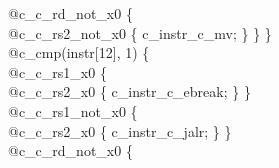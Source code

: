 {\indent \hspace{\parindent} \hspace{\parindent} \hspace{\parindent} \hspace{\parindent} @c\_c\_rd\_not\_x0 \{\\%
\indent \hspace{\parindent} \hspace{\parindent} \hspace{\parindent} \hspace{\parindent} \hspace{\parindent} @c\_c\_rs2\_not\_x0 \{ c\_instr\_c\_mv; \} \} \}\\%
\indent \hspace{\parindent} \hspace{\parindent} \hspace{\parindent} @c\_cmp(instr[12], 1) \{\\%
\indent \hspace{\parindent} \hspace{\parindent} \hspace{\parindent} \hspace{\parindent} @c\_c\_rs1\_x0 \{\\%
\indent \hspace{\parindent} \hspace{\parindent} \hspace{\parindent} \hspace{\parindent} \hspace{\parindent} @c\_c\_rs2\_x0 \{ c\_instr\_c\_ebreak; \} \}\\%
\indent \hspace{\parindent} \hspace{\parindent} \hspace{\parindent} \hspace{\parindent} @c\_c\_rs1\_not\_x0 \{\\%
\indent \hspace{\parindent} \hspace{\parindent} \hspace{\parindent} \hspace{\parindent} \hspace{\parindent} @c\_c\_rs2\_x0 \{ c\_instr\_c\_jalr; \} \}\\%
\indent \hspace{\parindent} \hspace{\parindent} \hspace{\parindent} \hspace{\parindent} @c\_c\_rd\_not\_x0 \{\\%
}

